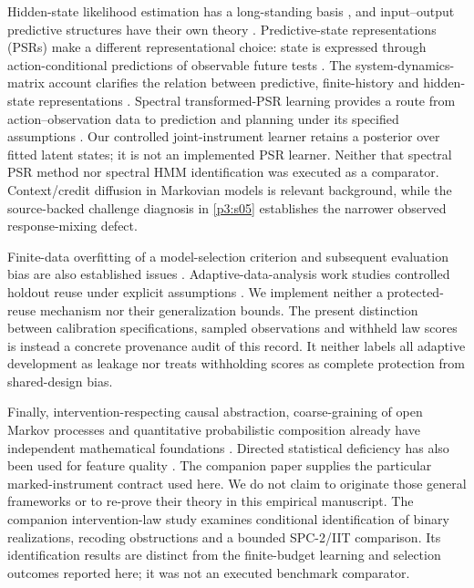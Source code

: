 Hidden-state likelihood estimation has a long-standing basis \cite{Baum1970}, and input--output predictive structures have their own theory \cite{Barnett2015}. Predictive-state representations (PSRs) make a different representational choice: state is expressed through action-conditional predictions of observable future tests \cite{Littman2001PSR}. The system-dynamics-matrix account clarifies the relation between predictive, finite-history and hidden-state representations \cite{Singh2004PSR}. Spectral transformed-PSR learning provides a route from action--observation data to prediction and planning under its specified assumptions \cite{Boots2009PSR}. Our controlled joint-instrument learner retains a posterior over fitted latent states; it is not an implemented PSR learner. Neither that spectral PSR method nor spectral HMM identification \cite{Hsu2012} was executed as a comparator. Context/credit diffusion in Markovian models \cite{Bengio1995} is relevant background, while the source-backed challenge diagnosis in \cref{p3:s05} establishes the narrower observed response-mixing defect.

Finite-data overfitting of a model-selection criterion and subsequent evaluation bias are also established issues \cite{Cawley2010}. Adaptive-data-analysis work studies controlled holdout reuse under explicit assumptions \cite{Dwork2015}. We implement neither a protected-reuse mechanism nor their generalization bounds. The present distinction between calibration specifications, sampled observations and withheld law scores is instead a concrete provenance audit of this record. It neither labels all adaptive development as leakage nor treats withholding scores as complete protection from shared-design bias.

Finally, intervention-respecting causal abstraction, coarse-graining of open Markov processes and quantitative probabilistic composition already have independent mathematical foundations \cite{Rubenstein2017,Baez2018,Gebler2013}. Directed statistical deficiency has also been used for feature quality \cite{vanRooyen2014}. The companion paper \cite{RodgersPaper2} supplies the particular marked-instrument contract used here. We do not claim to originate those general frameworks or to re-prove their theory in this empirical manuscript. The companion intervention-law study \cite{RodgersPaper4} examines conditional identification of binary realizations, recoding obstructions and a bounded SPC-2/IIT comparison. Its identification results are distinct from the finite-budget learning and selection outcomes reported here; it was not an executed benchmark comparator.

